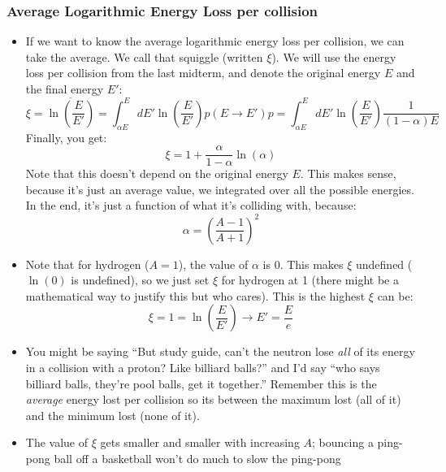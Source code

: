 \documentclass[letter]{article}
\begin{document}
\subsubsection{Average Logarithmic Energy Loss per collision}

\begin{itemize}

\item If we want to know the average logarithmic energy loss per
  collision, we can take the average. We call that squiggle (written
  $\xi$). We will use the energy loss per collision from the last
  midterm, and denote the original energy $E$ and the final energy
  $E'$:
  \begin{equation*}
    \xi = \overline{\ln\left(\frac{E}{E'}\right)} =
    \int^E_{\alpha{}E}dE'\ln\left(\frac{E}{E'}\right)p(E\to{}E')p = \int^E_{\alpha{}E}dE'\ln\left(\frac{E}{E'}\right)\frac{1}{(1-\alpha)E}
  \end{equation*}
Finally, you get:
\begin{equation*}
  \xi = 1+\frac{\alpha}{1-\alpha}\ln(\alpha)
\end{equation*}
Note that this doesn't depend on the original energy $E$. This makes
sense, because it's just an average value, we integrated over all the
possible energies. In the end, it's just a function of what it's
colliding with, because:
\begin{equation*}
  \alpha = \left(\frac{A-1}{A+1}\right)^2
\end{equation*}
\cite[Lec. 9]{lecture}
\item Note that for hydrogen ($A=1$), the value of $\alpha$ is 0. This
  makes $\xi$ undefined ($\ln(0)$ is undefined), so we just set $\xi$
  for hydrogen at 1 (there might be a mathematical way to justify this
  but who cares). This is the highest $\xi$ can be:
  \begin{equation*}
    \xi = 1 = \ln\left(\frac{E}{E'}\right) \to E'=\frac{E}{e}
  \end{equation*}
\item You might be saying ``But study guide, can't the neutron lose
  \textit{all} of its energy in a collision with a proton? Like
  billiard balls?'' and I'd say ``who says billiard balls, they're
  pool balls, get it together.'' Remember this is the \textit{average} energy lost per
  collision so its between the maximum lost (all of it) and the
  minimum lost (none of it).
\item The value
  of $\xi$ gets smaller and smaller with increasing $A$; bouncing a
  ping-pong ball off a basketball won't do much to slow the ping-pong

\end{itemize}
\end{document}

